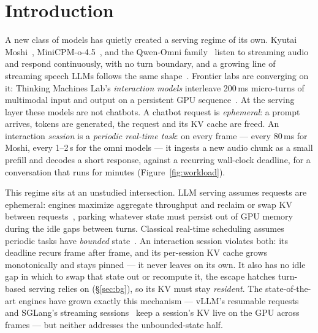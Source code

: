 \section{Introduction}
\label{sec:intro}

A new class of models has quietly created a serving regime of its own. Kyutai Moshi~\citep{moshi},
MiniCPM-o-4.5~\citep{minicpmo}, and the Qwen-Omni family~\citep{qwen2audio,qwen25omni} listen to streaming
audio and respond continuously, with no turn boundary, and a growing line of streaming speech LLMs follows
the same shape~\citep{miniomni,llamaomni}. Frontier labs are converging on it: Thinking Machines Lab's
\emph{interaction models} interleave 200\,ms micro-turns of multimodal input and output on a persistent
GPU sequence~\citep{tmlinteraction}. At the serving layer these models are not chatbots. A chatbot
request is \emph{ephemeral}: a prompt arrives, tokens are generated, the request and its KV cache are
freed. An interaction \emph{session} is a \emph{periodic real-time task}: on every frame --- every 80\,ms
for Moshi, every 1--2\,s for the omni models --- it ingests a new audio chunk as a small prefill and
decodes a short response, against a recurring wall-clock deadline, for a conversation that runs for
minutes (Figure~\ref{fig:workload}).

This regime sits at an unstudied intersection. LLM serving assumes requests are ephemeral: engines
maximize aggregate throughput and reclaim or swap KV between requests~\citep{orca,vllm,clockwork},
parking whatever state must persist out of GPU memory during the idle gaps between turns. Classical
real-time scheduling assumes periodic tasks have \emph{bounded} state~\citep{liulayland}. An
interaction session violates both: its deadline recurs frame after frame, and its per-session KV cache
grows monotonically and stays pinned --- it never leaves on its own. It also has no idle gap in which
to swap that state out or recompute it, the escape hatches turn-based serving relies on
(\S\ref{sec:bg}), so its KV must stay \emph{resident}. The state-of-the-art engines have grown exactly
this mechanism --- vLLM's resumable requests~\citep{vllmrealtime} and SGLang's streaming
sessions~\citep{sglang,tmlinteraction} keep a session's KV live on the GPU across frames ---
but neither addresses the unbounded-state half.

